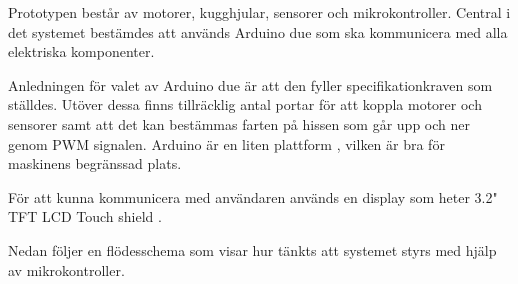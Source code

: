 Prototypen består av motorer, kugghjular, sensorer och mikrokontroller. Central i det systemet bestämdes att används Arduino due som ska kommunicera med alla elektriska komponenter.

Anledningen för valet av Arduino due är att den fyller specifikationkraven som ställdes. Utöver dessa finns tillräcklig antal portar för att koppla motorer och sensorer samt att det kan bestämmas farten på hissen som går upp och ner  genom PWM signalen. Arduino är en liten plattform , vilken är bra för maskinens begränssad plats. 


För att kunna kommunicera med användaren används en display som heter 3.2" TFT LCD Touch shield .

Nedan följer en flödesschema som visar hur tänkts att systemet styrs med hjälp av mikrokontroller.